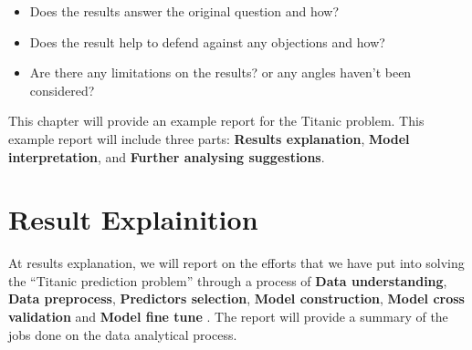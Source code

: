 \documentclass[
]{book}
\begin{document}
\begin{itemize}
\item
  Does the results answer the original question and how?
\item
  Does the result help to defend against any objections and how?
\item
  Are there any limitations on the results? or any angles haven't been considered?
\end{itemize}

This chapter will provide an example report for the Titanic problem. This example report will include three parts: \textbf{Results explanation}, \textbf{Model interpretation}, and \textbf{Further analysing suggestions}.

\hypertarget{result-explainition}{%
\section{Result Explainition}\label{result-explainition}}

At results explanation, we will report on the efforts that we have put into solving the ``Titanic prediction problem'' through a process of \textbf{Data understanding}, \textbf{Data preprocess}, \textbf{Predictors selection}, \textbf{Model construction}, \textbf{Model cross validation} and \textbf{Model fine tune} . The report will provide a summary of the jobs done on the data analytical process.
\end{document}
